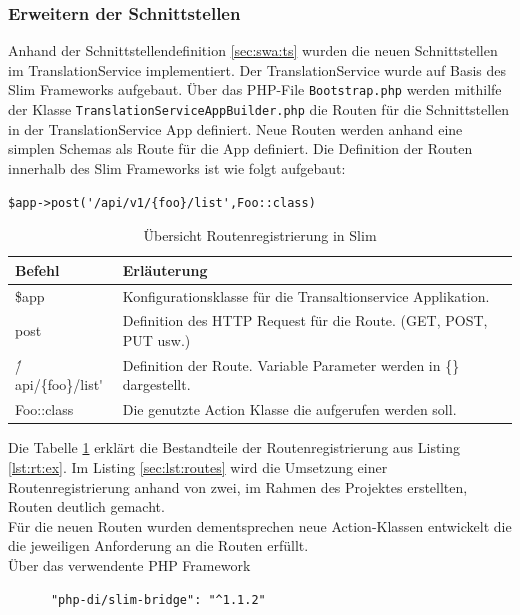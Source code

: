\documentclass[10pt, oneside, ngerman]{article}
\begin{document}
  \subsubsection{Erweitern der Schnittstellen} \label{sec:impl:api}
    Anhand der Schnittstellendefinition \ref{sec:swa:ts} wurden die neuen Schnittstellen im TranslationService implementiert. Der TranslationService wurde auf Basis des Slim Frameworks aufgebaut.
    Über das PHP-File \lstinline{Bootstrap.php} werden mithilfe der Klasse \lstinline{TranslationServiceAppBuilder.php} die Routen für die Schnittstellen in der TranslationService App definiert.
    Neue Routen werden anhand eine simplen Schemas als Route für die App definiert. Die Definition der Routen innerhalb des Slim Frameworks ist wie folgt aufgebaut:
    \begin{lstlisting}[caption={Beispielroute},label=lst:rt:ex, captionpos=b, label=lst:rt:ex]
      $app->post('/api/v1/{foo}/list',Foo::class)
    \end{lstlisting}
    \begin{table}[ht]
      \centering
      \begin{tabular}{l  l }
        \hline
        \rowcolor{carolinablue}
        Befehl & Erläuterung \\
        \hline
        \$app & Konfigurationsklasse für die Transaltionservice Applikation.\\
        \rowcolor{lightgray}
        post & Definition des HTTP Request für die Route.
                          (GET, POST, PUT usw.)\\
        \'/api/\{foo\}/list\' & Definition der Route. Variable Parameter werden in \{\} dargestellt.\\
        \rowcolor{lightgray}
        Foo::class & Die genutzte Action Klasse die aufgerufen werden soll.
      \end{tabular}
      \caption{Übersicht Routenregistrierung in Slim}
      \label{bzz}
    \end{table}
    Die Tabelle \ref{bzz} erklärt die Bestandteile der Routenregistrierung aus Listing \ref{lst:rt:ex}.
    Im Listing \ref{sec:lst:routes} wird die Umsetzung einer Routenregistrierung anhand von zwei, im Rahmen des Projektes erstellten, Routen deutlich gemacht.\\
    Für die neuen Routen wurden dementsprechen neue Action-Klassen entwickelt die die jeweiligen Anforderung an die Routen erfüllt. \\
    Über das verwendente PHP Framework \begin{lstlisting}
      "php-di/slim-bridge": "^1.1.2"
    \end{lstlisting}
\end{document}
